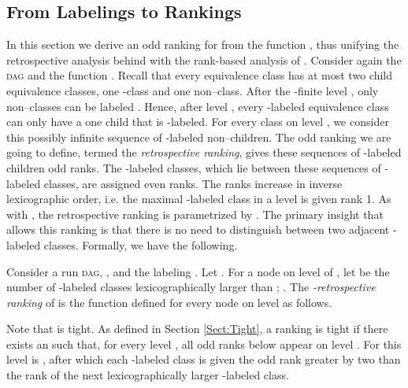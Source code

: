 \documentclass{LMCS}
\newcommand{\DAG}{\textsc{dag}\xspace}
\begin{document}
\subsection{From Labelings to Rankings}
In this section we derive an odd ranking for  from the function , thus unifying the
retrospective analysis behind  with the rank-based analysis of \cite{KV01c}.  Consider
again the \DAG  and 
the
function .  Recall that every equivalence class  has at
most two child equivalence classes, one -class and one non--class.  After the -finite level
, only non--classes can be labeled . Hence, after level , every -labeled
equivalence class  can only have a one child that is -labeled.  For every 
class  on level , we consider this possibly infinite sequence of -labeled
non--children. The odd ranking we are going to define, termed the {\em retrospective ranking},
gives these sequences of -labeled children odd ranks. The -labeled classes, which
lie between these sequences of -labeled classes, are assigned even ranks. The ranks increase
in inverse lexicographic order, i.e. the maximal -labeled class in a level is given rank 1. As
with , the retrospective ranking is parametrized by . The primary insight that allows
this ranking is that there is no need to distinguish between two adjacent -labeled classes.
Formally, we have the following.

\begin{defi}\label{kret_ranks}
Consider a run \DAG , , and the labeling .  Let
. For a node  on level  of , let  be the number of
-labeled classes lexicographically larger than ; .  The \emph{-retrospective ranking\/} of  is the function  defined for every node  on level  as follows.

\end{defi}

Note that  is tight. As defined in Section \ref{Sect:Tight}, a ranking is
tight if there exists an  such that, for every level , all odd ranks below  appear on level . For  this level is , after which each
-labeled class is given the odd rank greater by two than the rank of the next lexicographically larger
-labeled class. 
\end{document}
